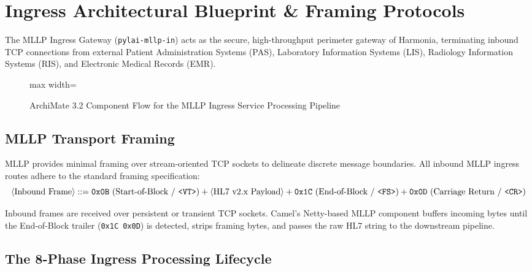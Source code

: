 \section{Ingress Architectural Blueprint \& Framing Protocols}
\label{sec:ingress_blueprint}

The MLLP Ingress Gateway (\texttt{pylai-mllp-in}) acts as the secure, high-throughput perimeter gateway of Harmonia, terminating inbound TCP connections from external Patient Administration Systems (PAS), Laboratory Information Systems (LIS), Radiology Information Systems (RIS), and Electronic Medical Records (EMR).

\begin{figure}[htbp]
    \centering
    \begin{adjustbox}{max width=\textwidth}
        
    \end{adjustbox}
    \caption{ArchiMate 3.2 Component Flow for the MLLP Ingress Service Processing Pipeline}
    \label{fig:mllp_ingress_process}
\end{figure}

\subsection{MLLP Transport Framing}

MLLP provides minimal framing over stream-oriented TCP sockets to delineate discrete message boundaries. All inbound MLLP ingress routes adhere to the standard framing specification:
\begin{equation}
\langle\text{Inbound Frame}\rangle ::= \texttt{0x0B}\ (\text{Start-of-Block / \texttt{<VT>}}) + \langle\text{HL7 v2.x Payload}\rangle + \texttt{0x1C}\ (\text{End-of-Block / \texttt{<FS>}}) + \texttt{0x0D}\ (\text{Carriage Return / \texttt{<CR>}})
\end{equation}

Inbound frames are received over persistent or transient TCP sockets. Camel's Netty-based MLLP component buffers incoming bytes until the End-of-Block trailer (\texttt{0x1C 0x0D}) is detected, strips framing bytes, and passes the raw HL7 string to the downstream pipeline.

\subsection{The 8-Phase Ingress Processing Lifecycle}

